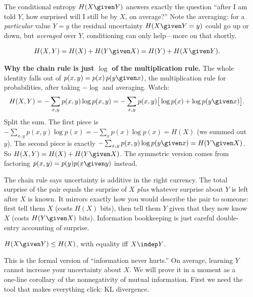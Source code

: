The conditional entropy $H(X \given Y)$ answers exactly the question ``after I am told $Y$, how surprised
will I still be by $X$, on average?'' Note the averaging: for a \emph{particular} value $Y=y$ the residual
uncertainty $H(X \given Y=y)$ could go up or down, but \emph{averaged} over $Y$, conditioning can only
help---more on that shortly.

\begin{theorem}
\label{ch33:chain-rule}
\[
  H(X,Y) = H(X) + H(Y \given X) = H(Y) + H(X \given Y).
\]
\end{theorem}

\begin{whybox}
\textbf{Why the chain rule is just $\log$ of the multiplication rule.} The whole identity falls out of
$p(x,y) = p(x)\,p(y \given x)$, the multiplication rule for probabilities, after taking $-\log$ and
averaging. Watch:
\[
  H(X,Y) = -\sum_{x,y} p(x,y)\log p(x,y)
         = -\sum_{x,y} p(x,y)\big[\log p(x) + \log p(y\given x)\big].
\]
Split the sum. The first piece is $-\sum_{x,y} p(x,y)\log p(x) = -\sum_x p(x)\log p(x) = H(X)$ (we summed
out $y$). The second piece is exactly $-\sum_{x,y} p(x,y)\log p(y\given x) = H(Y\given X)$. So $H(X,Y) =
H(X) + H(Y\given X)$. The symmetric version comes from factoring $p(x,y) = p(y)p(x\given y)$ instead.
\end{whybox}

\begin{happeningbox}
The chain rule says uncertainty is additive in the right currency. The total surprise of the pair equals
the surprise of $X$ \emph{plus} whatever surprise about $Y$ is left after $X$ is known. It mirrors exactly
how you would describe the pair to someone: first tell them $X$ (costs $H(X)$ bits), then tell them $Y$
given that they now know $X$ (costs $H(Y\given X)$ bits). Information bookkeeping is just careful
double-entry accounting of surprise.
\end{happeningbox}

\begin{theorem}
\label{ch33:cond-reduces}
$H(X \given Y) \le H(X)$, with equality iff $X \indep Y$.
\end{theorem}

This is the formal version of ``information never hurts.'' On average, learning $Y$ cannot increase your
uncertainty about $X$. We will prove it in a moment as a one-line corollary of the nonnegativity of
mutual information. First we need the tool that makes everything click: KL divergence.

